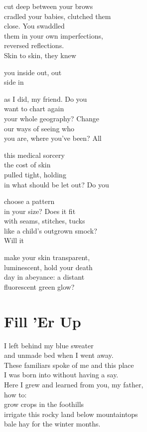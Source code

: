 \documentclass[twoside,10pt]{book}
\begin{document}
cut deep between your brows\\
cradled your babies, clutched them\\
close. You swaddled\\
them in your own imperfections,\\
reversed reflections.\\
Skin to skin, they knew

you inside out, out\\
side in

as I did, my friend. Do you\\
want to chart again\\
your whole geography? Change\\
our ways of seeing who\\
you are, where you've been? All

this medical sorcery\\
the cost of skin\\
pulled tight, holding\\
in what should be let out? Do you

choose a pattern\\
in your size? Does it fit\\
with seams, stitches, tucks\\
like a child's outgrown smock?\\
Will it

make your skin transparent,\\
luminescent, hold your death\\
day in abeyance: a distant\\
fluorescent green glow?


\clearpage
\section{Fill 'Er Up}

I left behind my blue sweater\\
and unmade bed when I went away.\\
These familiars spoke of me and this place\\
I was born into without having a say.\\
Here I grew and learned from you, my father,\\
how to:\\
grow crops in the foothills\\
irrigate this rocky land below mountaintops\\
bale hay for the winter months.
\end{document}
